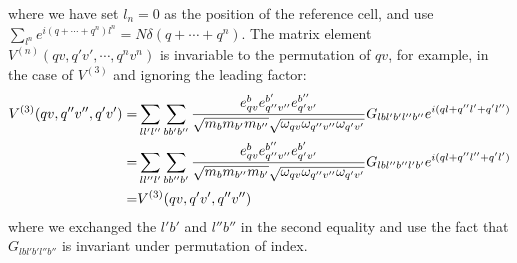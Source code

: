 \documentclass{article}
\begin{document}
where we have set $l_n = 0$ as the position of the reference cell, and use $\sum_{l^n} e^{i(q+\cdots+q^n)l^n} = N \delta(q + \cdots + q^n) $. The matrix element 
$V^{(n)}(qv,q'v',\cdots,q^nv^n)$ is invariable to the permutation of $qv$, for example, in the case of $V^{(3)}$ and ignoring the leading factor:
\begin{align}
    V^{(3)}(qv,q''v'',q'v') = & \sum_{ll'l''} \sum_{bb'b''} 
    \frac{e_{qv}^b e_{q''v''}^{b'} e_{q'v'}^{b''} }{\sqrt{m_b m_{b'} m_{b''}} \sqrt{\omega_{qv}\omega_{q''v''}\omega_{q'v'}}} G_{lbl'b'l''b''} e^{i(ql + q''l' + q'l'')} \notag \\
    = &\sum_{ll''l'} \sum_{bb''b'} 
    \frac{e_{qv}^b e_{q''v''}^{b''} e_{q'v'}^{b'} }{\sqrt{m_b m_{b''} m_{b'}} \sqrt{\omega_{qv}\omega_{q''v''}\omega_{q'v'}}} G_{lbl''b''l'b'} e^{i(ql + q''l'' + q'l')} \notag \\
    = &V^{(3)}(qv,q'v',q''v'')
\end{align}
where we exchanged the $l'b'$ and $l''b''$ in the second equality and use the fact that $G_{lbl'b'l''b''}$ is invariant under permutation of index.
\end{document}
